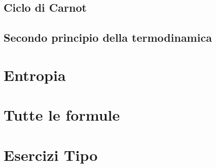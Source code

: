 \documentclass{article}
\begin{document}
\subsection{Ciclo di Carnot}
\subsection{Secondo principio della termodinamica}
\newpage
\section{Entropia}
\section{Tutte le formule}
\section{Esercizi Tipo}
\end{document}

